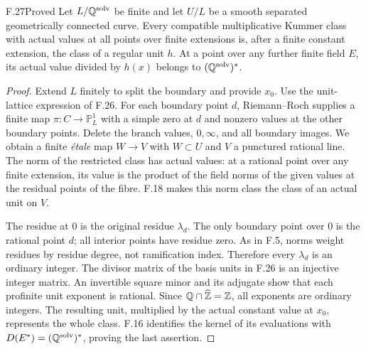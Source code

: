 \begin{claim}{F.27}{Proved}
Let $L/\mathbb Q^{\mathrm{solv}}$ be finite and let $U/L$ be a smooth
separated geometrically connected curve. Every compatible
multiplicative Kummer class with actual values at all points over
finite extensions is, after a finite constant extension, the class
of a regular unit $h$. At a point over any further finite field
$E$, its actual value divided by $h(x)$ belongs to
$(\mathbb Q^{\mathrm{solv}})^*$.
\end{claim}
\begin{proof}
Extend $L$ finitely to split the boundary and provide $x_0$.
Use the unit-lattice expression of F.26. For each boundary
point $d$, Riemann--Roch supplies a finite map
$\pi:C\to\mathbb P^1_L$ with a simple zero at $d$ and
nonzero values at the other boundary points. Delete the branch
values, $0,\infty$, and all boundary images. We obtain a finite
\emph{\'etale} map $W\to V$ with $W\subset U$ and $V$
a punctured rational line. The norm of the restricted class
has actual values: at a rational point over any finite extension,
its value is the product of the field norms of the given values
at the residual points of the fibre. F.18 makes this norm class
the class of an actual unit on $V$.

The residue at $0$ is the original residue $\lambda_d$.
The only boundary point over $0$ is the rational point $d$;
all interior points have residue zero. As in F.5, norms weight
residues by residue degree, not ramification index. Therefore
every $\lambda_d$ is an ordinary integer.
The divisor matrix of the basis units in F.26 is an injective
integer matrix. An invertible square minor and its adjugate
show that each profinite unit exponent is rational. Since
$\mathbb Q\cap\widehat{\mathbb Z}=\mathbb Z$, all exponents are ordinary integers.
The resulting unit, multiplied by the actual constant value at
$x_0$, represents the whole class. F.16 identifies the kernel
of its evaluations with $D(E^*)=(\mathbb Q^{\mathrm{solv}})^*$,
proving the last assertion.
\end{proof}

